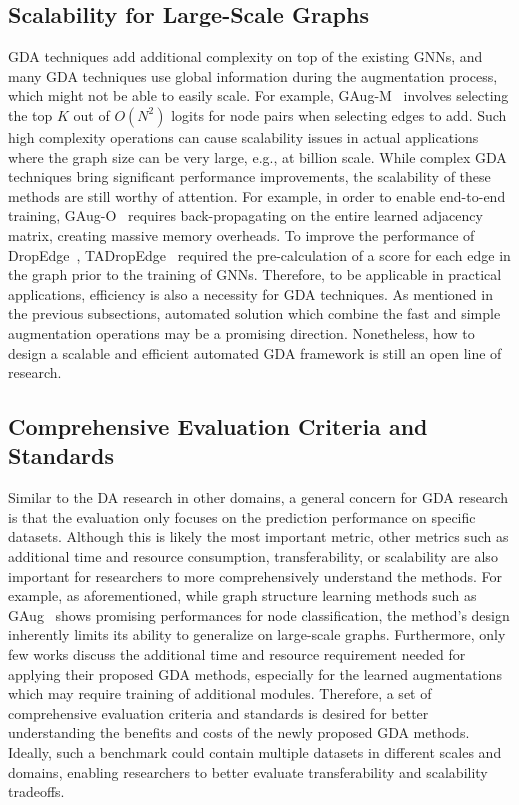 \documentclass[11pt]{article}
\begin{document}
\subsection{Scalability for Large-Scale Graphs}
GDA techniques add additional complexity on top of the existing GNNs, and many GDA techniques use global information during the augmentation process, which might not be able to easily scale. For example, GAug-M~\cite{zhao2021data} involves selecting the top $K$ out of $O(N^2)$ logits for node pairs when selecting edges to add. Such high complexity operations can cause scalability issues in actual applications where the graph size can be very large, e.g., at billion scale.
While complex GDA techniques bring significant performance improvements, the scalability of these methods are still worthy of attention. For example, in order to enable end-to-end training, GAug-O~\cite{zhao2021data} requires back-propagating on the entire learned adjacency matrix, creating massive memory overheads. To improve the performance of DropEdge~\cite{rong2019dropedge}, TADropEdge~\cite{gao2021training} required the pre-calculation of a score for each edge in the graph prior to the training of GNNs. Therefore, to be applicable in practical applications, efficiency is also a necessity for GDA techniques. As mentioned in the previous subsections, automated solution which combine the fast and simple augmentation operations may be a promising direction. Nonetheless, how to design a scalable and efficient automated GDA framework is still an open line of research.

\subsection{Comprehensive Evaluation Criteria and Standards}
Similar to the DA research in other domains, a general concern for GDA research is that the evaluation only focuses on the prediction performance on specific datasets. Although this is likely the most important metric, other metrics such as additional time and resource consumption, transferability, or scalability are also important for researchers to more comprehensively understand the methods. For example, as aforementioned, while graph structure learning methods such as GAug~\cite{zhao2021data} shows promising performances for node classification, the method's design inherently limits its ability to generalize on large-scale graphs. Furthermore, only few works discuss the additional time and resource requirement needed for applying their proposed GDA methods, especially for the learned augmentations which may require training of additional modules. 
Therefore, a set of comprehensive evaluation criteria and standards is desired for better understanding the benefits and costs of the newly proposed GDA methods.
Ideally, such a benchmark could contain multiple datasets in different scales and domains, enabling researchers to better evaluate transferability and scalability tradeoffs.
\end{document}
